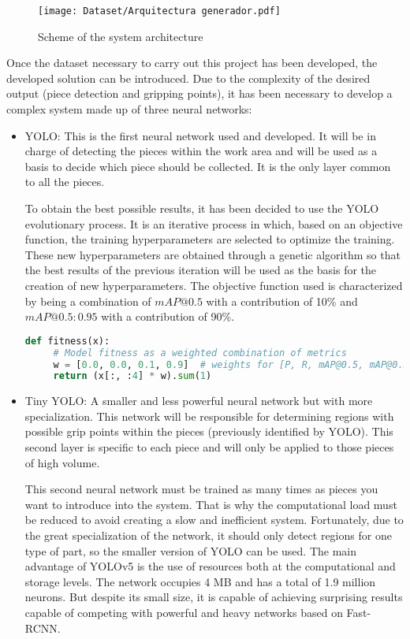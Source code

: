 {\begin{figure}[ht]
	\centering
	\texttt{[image: Dataset/Arquitectura generador.pdf]}
	\caption{Scheme of the system architecture}
	\label{chap:Abstract fig:Arquitectura generador}
	\vspace{-5pt}
\end{figure}

Once the dataset necessary to carry out this project has been developed, the developed solution can be introduced. Due to the complexity of the desired output (piece detection and gripping points), it has been necessary to develop a complex system made up of three neural networks:

\begin{itemize}
\item YOLO: This is the first neural network used and developed. It will be in charge of detecting the pieces within the work area and will be used as a basis to decide which piece should be collected. It is the only layer common to all the pieces.

To obtain the best possible results, it has been decided to use the YOLO evolutionary process. It is an iterative process in which, based on an objective function, the training hyperparameters are selected to optimize the training. These new hyperparameters are obtained through a genetic algorithm so that the best results of the previous iteration will be used as the basis for the creation of new hyperparameters. The objective function used is characterized by being a combination of $mAP@0.5$ with a contribution of 10\% and $mAP@0.5:0.95$ with a contribution of 90\%.

\begin{lstlisting}[language=Python]
 def fitness(x): 
     # Model fitness as a weighted combination of metrics 
     w = [0.0, 0.0, 0.1, 0.9]  # weights for [P, R, mAP@0.5, mAP@0.5:0.95] 
     return (x[:, :4] * w).sum(1) 
\end{lstlisting}

\item Tiny YOLO: A smaller and less powerful neural network but with more specialization. This network will be responsible for determining regions with possible grip points within the pieces (previously identified by YOLO). This second layer is specific to each piece and will only be applied to those pieces of high volume.

This second neural network must be trained as many times as pieces you want to introduce into the system. That is why the computational load must be reduced to avoid creating a slow and inefficient system. Fortunately, due to the great specialization of the network, it should only detect regions for one type of part, so the smaller version of YOLO can be used. The main advantage of YOLOv5 is the use of resources both at the computational and storage levels. The network occupies 4 MB and has a total of 1.9 million neurons. But despite its small size, it is capable of achieving surprising results capable of competing with powerful and heavy networks based on Fast-RCNN.


\end{itemize}}
